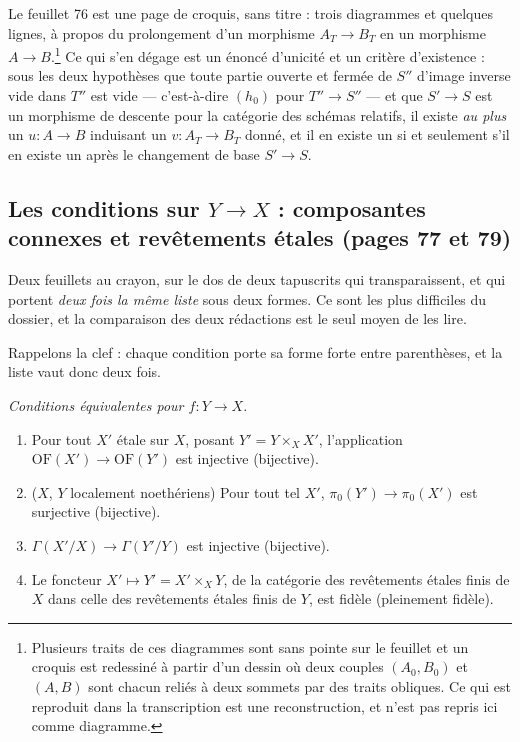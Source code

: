 \documentclass[11pt,a4paper]{article}
\begin{document}
Le feuillet 76 est une page de croquis, sans titre : trois diagrammes et
quelques lignes, à propos du prolongement d'un morphisme $A_{T} \to B_{T}$ en
un morphisme $A \to B$.\footnote{Plusieurs traits de ces diagrammes sont sans
pointe sur le feuillet et un croquis est redessiné à partir d'un dessin où deux
couples $(A_{0}, B_{0})$ et $(A, B)$ sont chacun reliés à deux sommets par des
traits obliques. Ce qui est reproduit dans la transcription est une
reconstruction, et n'est pas repris ici comme diagramme.} Ce qui s'en dégage est
un énoncé d'unicité et un critère d'existence : sous les deux hypothèses que
toute partie ouverte et fermée de $S''$ d'image inverse vide dans $T''$ est
vide — c'est-à-dire $(h_{0})$ pour $T'' \to S''$ — et que $S' \to S$ est un
morphisme de descente pour la catégorie des schémas relatifs, il existe
\emph{au plus} un $u : A \to B$ induisant un $v : A_{T} \to B_{T}$ donné, et il
en existe un si et seulement s'il en existe un après le changement de base $S'
\to S$.

\subsection*{Les conditions sur $Y \to X$ : composantes connexes et revêtements étales (pages 77 et 79)}

Deux feuillets au crayon, sur le dos de deux tapuscrits qui transparaissent, et
qui portent \emph{deux fois la même liste} sous deux formes. Ce sont les plus
difficiles du dossier, et la comparaison des deux rédactions est le seul moyen
de les lire.

Rappelons la clef : chaque condition porte sa forme forte entre parenthèses, et
la liste vaut donc deux fois.

\emph{Conditions équivalentes pour $f : Y \to X$.}

\begin{enumerate}
  \item[(i)] Pour tout $X'$ étale sur $X$, posant $Y' = Y \times_{X} X'$,
  l'application $\mathrm{OF}(X') \to \mathrm{OF}(Y')$ est injective
  (bijective).
  \item[(i bis)] ($X$, $Y$ localement noethériens) Pour tout tel $X'$,
  $\pi_{0}(Y') \to \pi_{0}(X')$ est surjective (bijective).
  \item[(ii)] $\Gamma(X'/X) \to \Gamma(Y'/Y)$ est injective (bijective).
  \item[(iii)] Le foncteur $X' \mapsto Y' = X' \times_{X} Y$, de la catégorie
  des revêtements étales finis de $X$ dans celle des revêtements étales finis
  de $Y$, est fidèle (pleinement fidèle).
\end{enumerate}
\end{document}
